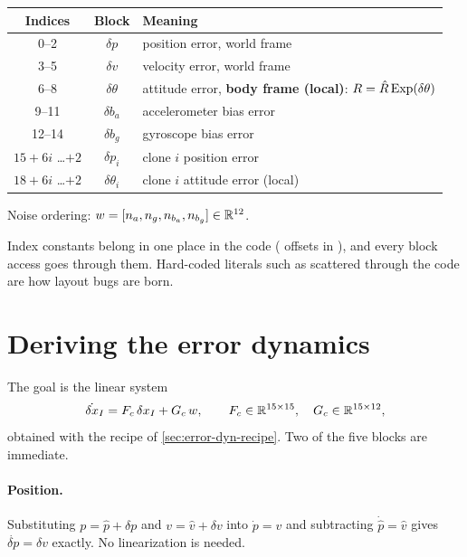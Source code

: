 \begin{convention}
\begin{center}\small
\begin{tabular}{@{}c c l@{}}
\toprule
Indices & Block & Meaning \\
\midrule
0--2 & $\delta p$ & position error, world frame \\
3--5 & $\delta v$ & velocity error, world frame \\
6--8 & $\delta\theta$ & attitude error, \textbf{body frame (local)}: $R = \hat R\operatorname{Exp}(\delta\theta)$ \\
9--11 & $\delta b_a$ & accelerometer bias error \\
12--14 & $\delta b_g$ & gyroscope bias error \\
$15+6i$ \dots $+2$ & $\delta p_i$ & clone $i$ position error \\
$18+6i$ \dots $+2$ & $\delta\theta_i$ & clone $i$ attitude error (local) \\
\bottomrule
\end{tabular}
\end{center}
Noise ordering: $w = [n_a, n_g, n_{b_a}, n_{b_g}] \in \mathbb{R}^{12}$.
\end{convention}

Index constants belong in one place in the code ( offsets in ), and every block
access goes through them. Hard-coded literals such as  scattered through the code are how
layout bugs are born.

\section{Deriving the error dynamics}
\label{sec:deriving-Fc}

The goal is the linear system
\begin{equation}
  \dot{\delta x}_I = F_c\,\delta x_I + G_c\,w, \qquad F_c \in \mathbb{R}^{15\times15},\quad G_c \in \mathbb{R}^{15\times12},
\end{equation}
obtained with the recipe of \cref{sec:error-dyn-recipe}. Two of the five blocks are immediate.

\paragraph{Position.} Substituting $p = \hat p + \delta p$ and $v = \hat v + \delta v$ into $\dot p = v$ and subtracting
$\dot{\hat p} = \hat v$ gives $\dot{\delta p} = \delta v$ exactly. No linearization is needed.

